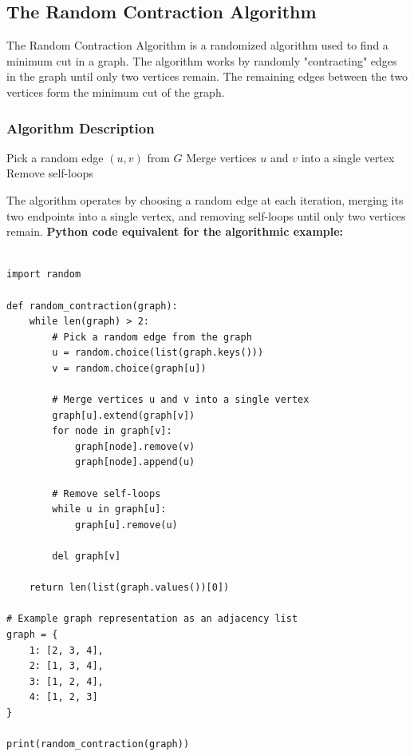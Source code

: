\documentclass[12pt]{book} %
\begin{document}
\subsection{The Random Contraction Algorithm}
The Random Contraction Algorithm is a randomized algorithm used to find a minimum cut in a graph. The algorithm works by randomly "contracting" edges in the graph until only two vertices remain. The remaining edges between the two vertices form the minimum cut of the graph.
\FloatBarrier

\subsubsection{Algorithm Description}
\begin{algorithm}
\caption{Random Contraction Algorithm}
\begin{algorithmic}[1]
    \State Pick a random edge $(u,v)$ from $G$
    \State Merge vertices $u$ and $v$ into a single vertex
    \State Remove self-loops
    \EndWhile
\EndFunction
\end{algorithmic}
\end{algorithm}
\FloatBarrier
The algorithm operates by choosing a random edge at each iteration, merging its two endpoints into a single vertex, and removing self-loops until only two vertices remain.
\FloatBarrier
\textbf{Python code equivalent for the algorithmic example:}
\begin{lstlisting}

import random

def random_contraction(graph):
    while len(graph) > 2:
        # Pick a random edge from the graph
        u = random.choice(list(graph.keys()))
        v = random.choice(graph[u])

        # Merge vertices u and v into a single vertex
        graph[u].extend(graph[v])
        for node in graph[v]:
            graph[node].remove(v)
            graph[node].append(u)
        
        # Remove self-loops
        while u in graph[u]:
            graph[u].remove(u)
        
        del graph[v]

    return len(list(graph.values())[0])

# Example graph representation as an adjacency list
graph = {
    1: [2, 3, 4],
    2: [1, 3, 4],
    3: [1, 2, 4],
    4: [1, 2, 3]
}

print(random_contraction(graph))
    
\end{lstlisting}
\FloatBarrier
\end{document}
